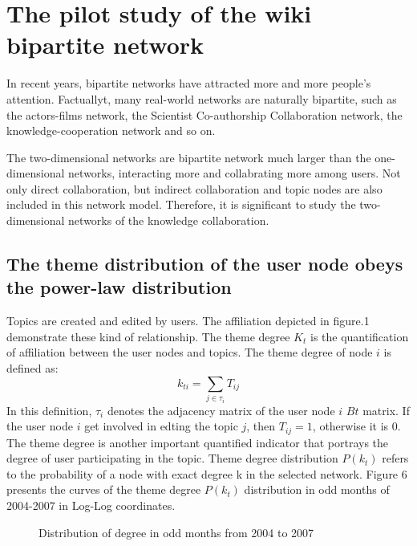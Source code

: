 \documentclass{elsarticle}
\begin{document}
\section{The pilot study of the wiki bipartite network}
\label{sec:4the-pilot-study}

In recent years, bipartite networks have attracted more and more people's attention\cite{watts1998sw,morris-2005,PhysRevE.64.026118}. Factuallyt, many real-world networks are naturally bipartite, such as the actors-films network\cite{watts1998sw}, the Scientist Co-authorship Collaboration network\cite{morris-2005,PhysRevE.64.026118}, the knowledge-cooperation network and so on.

The two-dimensional networks are  bipartite network much larger than the one-dimensional
networks, interacting more and collabrating more among users. Not only
direct collaboration, but indirect collaboration and topic nodes are
also included in this network model. Therefore, it is  significant to study the
two-dimensional networks of the knowledge collaboration. 

\subsection{The theme distribution of the user node obeys the power-law distribution}
\label{sec:theme-distr-user}

Topics are created and edited by users. The affiliation depicted in
figure.1 demonstrate these kind of relationship. 
The theme degree $K_t$ is the quantification of
affiliation between  the user nodes and topics. The theme degree of
node $i$ is
defined as:
\begin{equation}
  \label{eq:1}
  k_{ti}=\sum_{j \in \tau_i} T_{ij}
\end{equation}
In this definition, $\tau_i$ denotes the adjacency matrix of the user node $i$ $Bt$
matrix. If the user node $i$ get involved in  edting the topic
$j$, then $T_{ij}=1$, otherwise
it is 0. The theme degree is
another important quantified indicator that portrays the degree of
user participating in the topic. Theme degree distribution $P(k_t)$
refers to the probability of a node with exact degree k in the
selected network. Figure 6 presents the curves of the theme degree
$P(k_t)$  distribution  in odd months of 2004-2007 in Log-Log
coordinates. 

\begin{figure}[htpb]
  \centering
  \subfigure[ ]{
     \scalebox{0.18}{\texttt{[image: 06-1]}}
   } \quad
  \subfigure[ ]{ 
       \scalebox{0.18}{\texttt{[image: 06-2]}}
   } 
  
    \subfigure[ ]{
     \scalebox{0.18}{\texttt{[image: 06-3]}}
   } \quad
  \subfigure[ ]{ 
       \scalebox{0.18}{\texttt{[image: 06-4]}}
   } 
  
    \subfigure[ ]{
     \scalebox{0.18}{\texttt{[image: 06-5]}}
   } \quad
  \subfigure[ ]{ 
       \scalebox{0.18}{\texttt{[image: 06-6]}}
   } 

    \subfigure[ ]{
     \scalebox{0.18}{\texttt{[image: 06-7]}}
   } \quad
  \subfigure[ ]{ 
       \scalebox{0.18}{\texttt{[image: 06-8]}}
   } 
   \caption{Distribution of degree in odd months from 2004 to 2007}
\end{figure}
\end{document}
